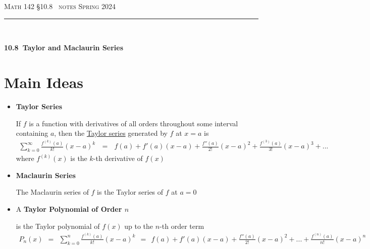\documentclass{article}
\def\chapt{10.8}
\def\chaptname{Taylor and Maclaurin Series}
\begin{document}
\noindent
{\scshape Math 142} \hfill {\scshape \S\chapt~ notes} \hfill {\scshape Spring 2024}

\smallskip

\hrule

\bigskip

\hfill
\\

\thispagestyle{empty}

{
\huge
\noindent
\textbf{\chapt~\chaptname}
}

\section*{Main Ideas}

\begin{itemize}

\item
\textbf{Taylor Series}

If $f$ is a function with derivatives of all orders throughout some interval containing
$a$, then the \underline{Taylor series} generated by $f$ at $x=a$ is
\begin{gather*}
\sum_{k=0}^{\infty} \frac{f^{(k)}(a)}{k!}(x-a)^k
~~~=~~~
f(a)+f'(a)(x-a)+\frac{f''(a)}{2!}(x-a)^2+\frac{f^{(3)}(a)}{3!}(x-a)^3+...
\end{gather*}
where $f^{(k)}(x)$ is the $k$-th derivative of $f(x)$
\\

\item
\textbf{Maclaurin Series}

The Maclaurin series of $f$ is the Taylor series of $f$ at $a=0$
\\

\item
A \textbf{Taylor Polynomial of Order $n$}

is the Taylor polynomial of $f(x)$ up
to the $n$-th order term
\begin{gather*}
P_n (x) ~~=~~
\sum_{k=0}^{n} \frac{f^{(k)}(a)}{k!}(x-a)^k ~~=~~
f(a)+f'(a)(x-a)+\frac{f''(a)}{2!}(x-a)^2+...+\frac{f^{(n)}(a)}{n!}(x-a)^n
\end{gather*}

\end{itemize}
\end{document}
